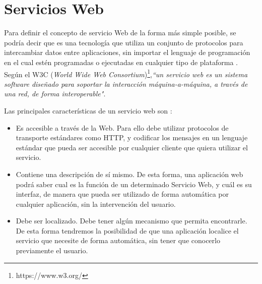 \section{Servicios Web}
\label{cap:sec:serviciosweb}

Para definir el concepto de servicio Web de la forma más simple posible, se podría decir que es una tecnología que utiliza un conjunto de protocolos para intercambiar datos entre aplicaciones, sin importar el lenguaje de programación en el cual estén programadas o ejecutadas en cualquier tipo de plataforma \citep{wiki:w3c2004}. Según el W3C (\textit{World Wide Web Consortium})\footnote{https://www.w3.org/},\textit{``un servicio web es un sistema software diseñado para soportar la interacción máquina-a-máquina, a través de una red, de forma interoperable"}.




Las principales características de un servicio web son \citep{TorresJoaquin2017SC}:



\begin{itemize}
	\item Es accesible a través de la Web. Para ello debe utilizar protocolos de transporte estándares como HTTP, y codificar los mensajes en un lenguaje estándar que pueda ser accesible por cualquier cliente que quiera utilizar el servicio. 
	\item Contiene una descripción de sí mismo. De esta forma, una aplicación web podrá saber cual es la función de un determinado Servicio Web, y cuál es su interfaz, de manera que pueda ser utilizado de forma automática por cualquier aplicación, sin la intervención del usuario.
	\item Debe ser localizado. Debe tener algún mecanismo que permita encontrarle. De esta forma tendremos la posibilidad de que una aplicación localice el servicio que necesite de forma automática, sin tener que conocerlo previamente el usuario.
\end{itemize}

